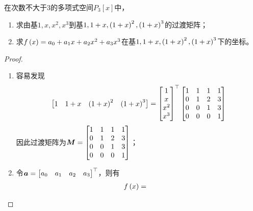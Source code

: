 \begin{problem}
在次数不大于\(3\)的多项式空间\(P_3[x]\)中，
\begin{enumerate}
    \item 求由基\(1,x,x^2,x^3\)到基\(1,1+x,\left( 1+x \right)^2,\left( 1+x \right)^3\)的过渡矩阵；
    \item 求\(f\left( x \right)=a_0+a_1x+a_2x^2+a_3x^3\)在基\(1,1+x,\left( 1+x \right)^2,\left( 1+x \right)^3\)下的坐标。
\end{enumerate}
\end{problem}
\begin{proof}
    \begin{enumerate}
        \item {
              容易发现
              \begin{equation*}
                  \begin{bmatrix}
                      1 & 1+x & \left( 1+x \right)^2 & \left( 1+x \right)^3
                  \end{bmatrix}=
                  \begin{bmatrix}
                      1 \\ x \\ x^2 \\ x^3
                  \end{bmatrix}^\top
                  \begin{bmatrix}
                      1 & 1 & 1 & 1 \\
                      0 & 1 & 2 & 3 \\
                      0 & 0 & 1 & 3 \\
                      0 & 0 & 0 & 1
                  \end{bmatrix}
              \end{equation*}
              因此过渡矩阵为\(\boldsymbol{M}=
              \begin{bmatrix}
                  1 & 1 & 1 & 1 \\
                  0 & 1 & 2 & 3 \\
                  0 & 0 & 1 & 3 \\
                  0 & 0 & 0 & 1
              \end{bmatrix}\)；
              }
        \item {
              令\(\boldsymbol{a}=\begin{bmatrix}a_0&a_1&a_2&a_3\end{bmatrix}^\top\)，则有
              \begin{align*}
                  f\mypar{x}
                   & =

\end{align*}}
\end{enumerate}
\end{proof}
